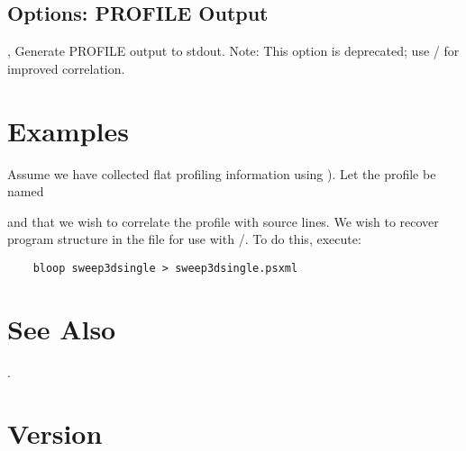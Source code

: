 \documentclass[english]{article}
\begin{document}
\subsection{Options: PROFILE Output}
\begin{Description}
  \item[\Opt{-p}, \Opt{--profile}] Generate PROFILE output to stdout. Note: This option is deprecated; use / for improved correlation.
\end{Description}



\section{Examples}

Assume we have collected flat profiling information using  ).  Let the profile be named \File{}


 and that we wish to correlate the profile with source lines.
We wish to recover program structure in the file  for use with /.
To do this, execute:
\begin{verbatim}
    bloop sweep3dsingle > sweep3dsingle.psxml
\end{verbatim}



\section{See Also}

.

\section{Version}
\end{document}
